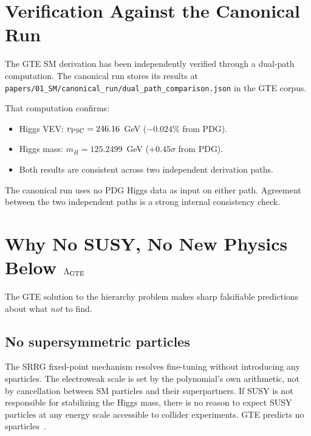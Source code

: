 \documentclass[11pt,a4paper]{article}
\begin{document}
\section{Verification Against the Canonical Run}
\label{sec:verify}

The GTE SM derivation has been independently verified through a dual-path
computation.
The canonical run stores its results at
\texttt{papers/01\_SM/canonical\_run/dual\_path\_comparison.json}
in the GTE corpus.

That computation confirms:
\begin{itemize}[itemsep=2pt]
  \item Higgs VEV: $v_{\rm PSC} = 246.16$~GeV ($-0.024\%$ from PDG).
  \item Higgs mass: $m_H = 125.2499$~GeV ($+0.45\sigma$ from PDG).
  \item Both results are consistent across two independent derivation paths.
\end{itemize}

The canonical run uses no PDG Higgs data as input on either path.
Agreement between the two independent paths is a strong internal consistency check.

\section{Why No SUSY, No New Physics Below $\Lambda_{\rm GTE}$}
\label{sec:nosusy}

The GTE solution to the hierarchy problem makes sharp falsifiable predictions
about what \emph{not} to find.

\subsection{No supersymmetric particles}

The SRRG fixed-point mechanism resolves fine-tuning without introducing
any sparticles.
The electroweak scale is set by the polynomial's own arithmetic, not by
cancellation between SM particles and their superpartners.
If SUSY is not responsible for stabilizing the Higgs mass, there is no
reason to expect SUSY particles at any energy scale accessible to collider experiments.
GTE predicts no sparticles~\cite{SpivackGTECompleteFramework}.
\end{document}
